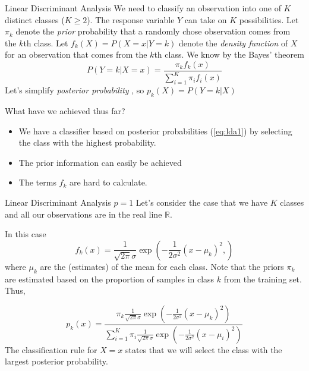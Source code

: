 \documentclass{beamer}
\begin{document}
\begin{frame}{Linear Discriminant Analysis}
	We need to classify an observation into one of $K$ distinct classes ($K\ge 2$). The response variable $Y$ can take on $K$ possibilities. Let $\pi_k$ denote the {\it prior} probability that a randomly chose observation comes from the $k$th class. Let $f_k(X)= P(X=x|Y=k)$ denote the {\it density function} of $X$ for an observation that comes from the $k$th class. We know by the Bayes' theorem
	\begin{equation}
		P(Y=k| X=x)= \frac{\pi_k f_k(x)}{\sum_{i=1}^K \pi_i f_i(x)}
		\label{eq:lda1}
	\end{equation}
 	Let's simplify  {\it posterior probability} , so $p_k(X)=P(Y=k|X)$ 
	
	What have we achieved thus far?
	\begin{itemize}
		\item We have a classifier based on posterior probabilities (\ref{eq:lda1}) by selecting the class with the highest probability. 
		\item The prior information can easily be achieved
		\item The terms $f_k$ are hard to calculate.
	\end{itemize}
\end{frame}


\begin{frame}{Linear Discriminant Analysis $p=1$}
	Let's consider the case that we have $K$ classes and all our observations are in the real line $\mathbb{R}$.
	
	
	In this case
	\begin{equation*}
		f_k(x)= \frac{1}{\sqrt{2\pi}\sigma} \exp\left( 
		-\frac{1}{2\sigma^2} (x-\mu_k)^2,
		\right)
	\end{equation*}
	where $\mu_k$ are the (estimates) of the mean for each class. Note that the priors $\pi_k$ are estimated based on the proportion of samples in class $k$ from the training set. Thus,
	
	\begin{equation*}
		p_k(x) = \frac{\pi_k \frac{1}{\sqrt{2\pi}\sigma} \exp\left( 
			-\frac{1}{2\sigma^2} (x-\mu_k)^2
			\right)}{\sum_{i=1}^K \pi_i \frac{1}{\sqrt{2\pi}\sigma} \exp\left( 
			-\frac{1}{2\sigma^2} (x-\mu_i)^2
			\right)}
	\end{equation*}
	The classification rule for $X=x$ states that we will select the class with the largest posterior probability.
	
	
\end{frame}
\end{document}
